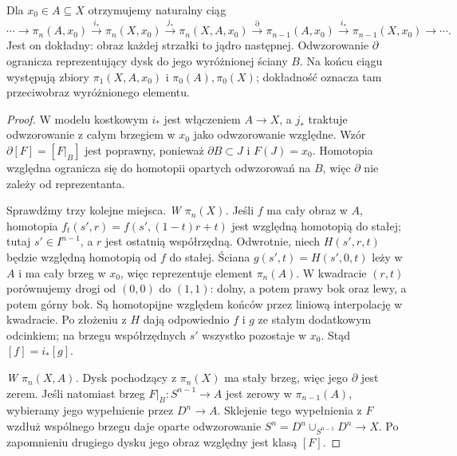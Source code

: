\begin{twierdzenie}
\label{thm:les-pi}
Dla $x_0\in A\subseteq X$ otrzymujemy
naturalny ciąg
\begin{equation}\label{eq:les-pi}
 \cdots\to\pi_n(A,x_0)\xrightarrow{i_*}
 \pi_n(X,x_0)\xrightarrow{j_*}
 \pi_n(X,A,x_0)\xrightarrow{\partial}
 \pi_{n-1}(A,x_0)\xrightarrow{i_*}
 \pi_{n-1}(X,x_0)\to\cdots .
\end{equation}
Jest on dokładny: obraz każdej
strzałki to jądro następnej.
Odwzorowanie $\partial$ ogranicza
reprezentujący dysk do jego
wyróżnionej ściany $B$.
Na końcu ciągu występują
zbiory $\pi_1(X,A,x_0)$ i
$\pi_0(A),\pi_0(X)$; dokładność
oznacza tam przeciwobraz
wyróżnionego elementu.
\end{twierdzenie}
\begin{proof}
W modelu kostkowym $i_*$ jest
włączeniem $A\to X$, a $j_*$
traktuje odwzorowanie z całym brzegiem
w $x_0$ jako odwzorowanie względne.
Wzór $\partial[F]=[F|_B]$
jest poprawny, ponieważ
$\partial B\subset J$ i
$F(J)=x_0$. Homotopia
względna ogranicza się
do homotopii opartych
odwzorowań na $B$, więc
$\partial$ nie zależy
od reprezentanta.

Sprawdźmy trzy kolejne miejsca.
\emph{W $\pi_n(X)$.} Jeśli $f$ ma cały obraz w $A$, homotopia
$f_t(s',r)=f(s',(1-t)r+t)$ jest względną homotopią do stałej;
tutaj $s'\in I^{n-1}$, a $r$ jest ostatnią współrzędną.
Odwrotnie, niech $H(s',r,t)$ będzie względną homotopią
od $f$ do stałej. Ściana $g(s',t)=H(s',0,t)$ leży w $A$
i ma cały brzeg w $x_0$, więc reprezentuje element $\pi_n(A)$.
W kwadracie $(r,t)$ porównujemy drogi od $(0,0)$ do $(1,1)$:
dolny, a potem prawy bok oraz lewy, a potem górny bok.
Są homotopijne względem końców przez liniową interpolację w kwadracie.
Po złożeniu z $H$ dają odpowiednio $f$ i $g$ ze stałym dodatkowym
odcinkiem; na brzegu współrzędnych $s'$ wszystko pozostaje w $x_0$.
Stąd $[f]=i_*[g]$.

\emph{W $\pi_n(X,A)$.} Dysk
pochodzący z $\pi_n(X)$
ma stały brzeg, więc jego
$\partial$ jest zerem.
Jeśli natomiast brzeg
$F|_B:S^{n-1}\to A$ jest
zerowy w $\pi_{n-1}(A)$,
wybieramy jego wypełnienie
przez $D^n\to A$. Sklejenie
tego wypełnienia z $F$
wzdłuż wspólnego brzegu
daje oparte odwzorowanie
$S^n=D^n\cup_{S^{n-1}}D^n\to X$.
Po zapomnieniu drugiego
dysku jego obraz względny
jest klasą $[F]$.


\end{proof}
